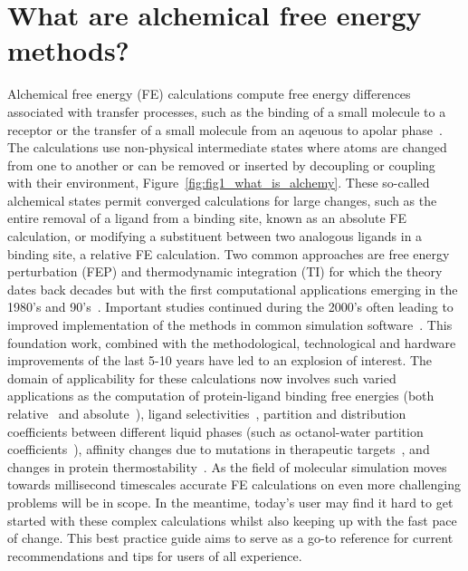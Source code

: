 \documentclass[9pt,bestpractices]{livecoms}
\begin{document}
\section{What are alchemical free energy methods?}
\label{sec:intro}
Alchemical free energy (FE) calculations compute free energy differences associated with transfer processes, such as the binding of a small molecule to a receptor or the transfer of a small molecule from an aqeuous to apolar phase~\cite{zwanzig1954hightemperature}. 
The calculations use non-physical intermediate states where atoms are changed from one to another or can be removed or inserted by decoupling or coupling with their environment, Figure~\ref{fig:fig1_what_is_alchemy}. These so-called alchemical states permit converged calculations for large changes, such as the entire removal of a ligand from a binding site, known as an absolute FE calculation, or modifying a substituent between two analogous ligands in a binding site, a relative FE calculation. Two common approaches are free energy perturbation (FEP) and thermodynamic integration (TI) for which the theory dates back decades but with the first computational applications emerging in the 1980's and 90's~\cite{kirkwood1935statistical, jorgensen1985monte, kollman1993free, wong1986dynamics, merz1989free}. Important studies continued during the 2000's often leading to improved implementation of the methods in common simulation software~\cite{vanderspoel2005gromacs, mermelstein2018fast, wang2015accurate, hedges2019biosimspace}. This foundation work, combined with the methodological, technological and hardware improvements of the last 5-10 years have led to an explosion of interest.  The domain of applicability for these calculations now involves such varied applications as the computation of protein-ligand binding free energies (both relative~\cite{relative-binding-free-energies} and absolute~\cite{absolute-binding-free-energies}), ligand selectivities~\cite{selectivity}, partition and distribution coefficients between different liquid phases (such as octanol-water partition coefficients~\cite{octanol-water-partition}), affinity changes due to mutations in therapeutic targets~\cite{hauser2018predicting,aldeghi2018accurate}, and changes in protein thermostability~\cite{seeliger2010protein,gapsys2016insights,gapsys2016accurate,aldeghi2019accurate}. As the field of molecular simulation moves towards millisecond timescales accurate FE calculations on even more challenging problems will be in scope. In the meantime, today's user may find it hard to get started with these complex calculations whilst also keeping up with the fast pace of change. This best practice guide aims to serve as a go-to reference for current recommendations and tips for users of all experience.  
\end{document}

